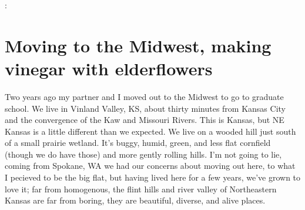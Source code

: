 \documentclass[10pt,a6paper,footinclude=false,firstfoot=false,headinclude=true,open=any,DIV=6]{scrbook} %
\begin{document}
\vspace{2ex}
\noindent{}:
\vspace{1ex}


\chapter{Moving to the Midwest, making vinegar with elderflowers}

Two years ago my partner and I moved out to the Midwest to go to graduate school. We live in Vinland Valley, KS, about thirty minutes from Kansas City and the convergence of the Kaw and Missouri Rivers. This is Kansas, but NE Kansas is a little different than we expected. We live on a wooded hill just south of a small prairie wetland. It's buggy, humid, green, and less flat cornfield (though we do have those) and more gently rolling hills. I'm not going to lie, coming from Spokane, WA we had our concerns about moving out here, to what I pecieved to be the big flat, but having lived here for a few years, we've grown to love it; far from homogenous, the flint hills and river valley of Northeastern Kansas are far from boring, they are beautiful, diverse, and alive places.
\end{document}
